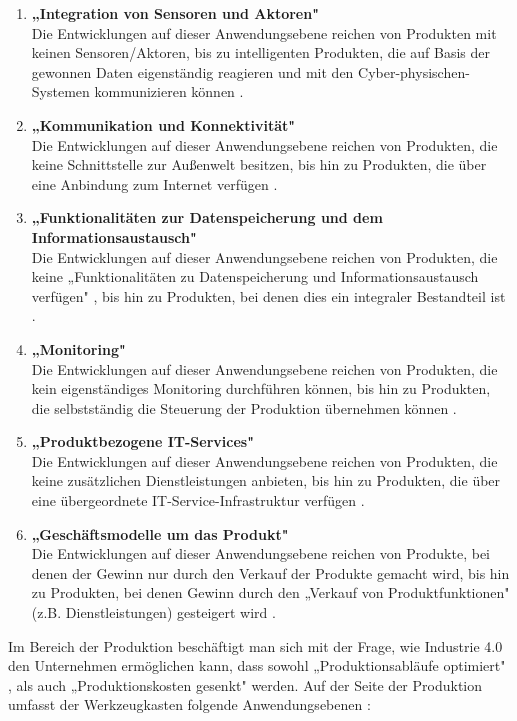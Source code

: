 \begin{enumerate}
	\item \textbf{„Integration von Sensoren und Aktoren"} \cite[S.13]{2} \\ Die Entwicklungen auf dieser Anwendungsebene reichen von Produkten mit keinen Sensoren/Aktoren, bis zu intelligenten Produkten, die auf Basis der gewonnen Daten eigenständig reagieren und mit den Cyber-physischen-Systemen kommunizieren können \cite[S.13]{2}.
	\item \textbf{„Kommunikation und Konnektivität"} \cite[S.13]{2} \\ Die Entwicklungen auf dieser Anwendungsebene reichen von Produkten, die keine Schnittstelle zur Außenwelt besitzen, bis hin zu Produkten, die über eine Anbindung zum Internet verfügen \cite[S.13]{2}.
	\item \textbf{„Funktionalitäten zur Datenspeicherung und dem Informationsaustausch"} \cite[S.13]{2} \\ Die Entwicklungen auf dieser Anwendungsebene reichen von Produkten, die keine „Funktionalitäten zu Datenspeicherung und Informationsaustausch verfügen" \cite[S.13]{2}, bis hin zu Produkten, bei denen dies ein integraler Bestandteil ist \cite[S.13]{2}.
	\item \textbf{„Monitoring"} \cite[S.13]{2} \\ Die Entwicklungen auf dieser Anwendungsebene reichen von Produkten, die kein eigenständiges Monitoring durchführen können, bis hin zu Produkten, die selbstständig die Steuerung der Produktion übernehmen können \cite[S.13]{2}.
	\item \textbf{„Produktbezogene IT-Services"} \cite[S.13]{2} \\ Die Entwicklungen auf dieser Anwendungsebene reichen von Produkten, die keine zusätzlichen Dienstleistungen anbieten, bis hin zu Produkten, die über eine übergeordnete IT-Service-Infrastruktur verfügen \cite[S.13]{2}.
	\item \textbf{„Geschäftsmodelle um das Produkt"} \cite[S.13]{2} \\ Die Entwicklungen auf dieser Anwendungsebene reichen von Produkte, bei denen der Gewinn nur durch den Verkauf der Produkte gemacht wird, bis hin zu Produkten, bei denen Gewinn durch den „Verkauf von Produktfunktionen" \cite[S.12]{2} (z.B. Dienstleistungen) gesteigert wird \cite[S.13]{2}.
\end{enumerate}
Im Bereich der Produktion beschäftigt man sich mit der Frage, wie Industrie 4.0 den Unternehmen ermöglichen kann, dass sowohl „Produktionsabläufe optimiert" \cite[S.15]{2}, als auch „Produktionskosten gesenkt" \cite[S.15]{2} werden. Auf der Seite der Produktion umfasst der Werkzeugkasten folgende Anwendungsebenen \cite[S.15]{2}:
